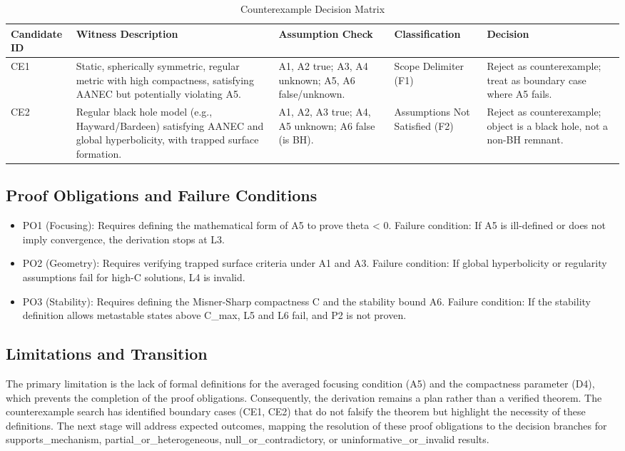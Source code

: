 \documentclass[conference]{IEEEtran}
\begin{document}
\begin{table}[htbp]
\centering
\footnotesize
\setlength{\tabcolsep}{3pt}
\renewcommand{\arraystretch}{1.12}
\caption{Counterexample Decision Matrix}
\label{tab:forward-derivation-and-counterexamples-fd08}
\begin{tabular}{|p{}|p{}|p{}|p{}|p{}|}
\hline
Candidate ID & Witness Description & Assumption Check & Classification & Decision \\\hline
CE1 & Static, spherically symmetric, regular metric with high compactness, satisfying AANEC but potentially violating A5. & A1, A2 true; A3, A4 unknown; A5, A6 false/unknown. & Scope Delimiter (F1) & Reject as counterexample; treat as boundary case where A5 fails. \\\hline
CE2 & Regular black hole model (e.g., Hayward/Bardeen) satisfying AANEC and global hyperbolicity, with trapped surface formation. & A1, A2, A3 true; A4, A5 unknown; A6 false (is BH). & Assumptions Not Satisfied (F2) & Reject as counterexample; object is a black hole, not a non-BH remnant. \\\hline
\end{tabular}
\end{table}

\subsection{Proof Obligations and Failure Conditions}
\begin{itemize}
\item PO1 (Focusing): Requires defining the mathematical form of A5 to prove theta < 0. Failure condition: If A5 is ill-defined or does not imply convergence, the derivation stops at L3.
\item PO2 (Geometry): Requires verifying trapped surface criteria under A1 and A3. Failure condition: If global hyperbolicity or regularity assumptions fail for high-C solutions, L4 is invalid.
\item PO3 (Stability): Requires defining the Misner-Sharp compactness C and the stability bound A6. Failure condition: If the stability definition allows metastable states above C\_max, L5 and L6 fail, and P2 is not proven.
\end{itemize}

\subsection{Limitations and Transition}
The primary limitation is the lack of formal definitions for the averaged focusing condition (A5) and the compactness parameter (D4), which prevents the completion of the proof obligations. Consequently, the derivation remains a plan rather than a verified theorem. The counterexample search has identified boundary cases (CE1, CE2) that do not falsify the theorem but highlight the necessity of these definitions. The next stage will address expected outcomes, mapping the resolution of these proof obligations to the decision branches for supports\_mechanism, partial\_or\_heterogeneous, null\_or\_contradictory, or uninformative\_or\_invalid results.
\end{document}
